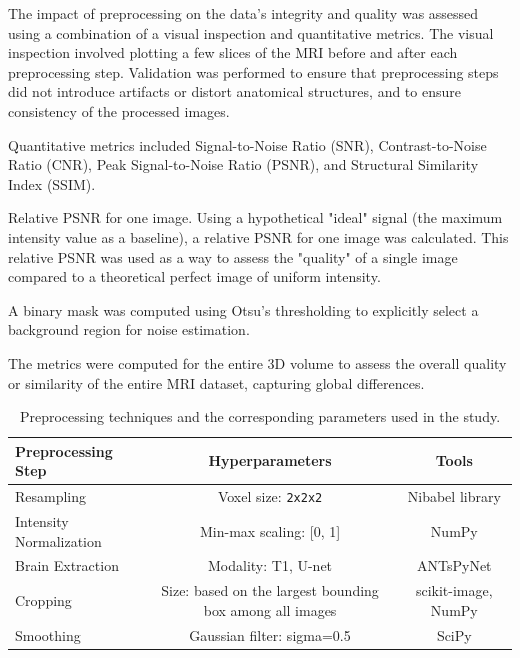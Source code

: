 The impact of preprocessing on the data's integrity and quality was assessed using a combination of a visual inspection and quantitative metrics. The visual inspection involved plotting a few slices of the MRI before and after each preprocessing step. Validation was performed to ensure that preprocessing steps did not introduce artifacts or distort anatomical structures, and to ensure consistency of the processed images.

Quantitative metrics included Signal-to-Noise Ratio (SNR), Contrast-to-Noise Ratio (CNR), Peak Signal-to-Noise Ratio (PSNR), and 
Structural Similarity Index (SSIM). 

Relative PSNR for one image. Using a hypothetical "ideal" signal (the maximum intensity value as a baseline), a relative PSNR for one image was calculated. This relative PSNR was used as a way to assess the "quality" of a single image compared to a theoretical perfect image of uniform intensity.

A binary mask was computed using Otsu's thresholding to explicitly select a background region for noise estimation.

The metrics were computed for the entire 3D volume to assess the overall quality or similarity of the entire MRI dataset, capturing global differences.
\begin{center}
    \begin{table}
        \centering
        \caption{\label{tab:preprocessing_pipeline}Preprocessing techniques and the corresponding parameters used in the study.}
        \begin{tabular*}{500pt}{@{\extracolsep\fill}lcc@{\extracolsep\fill}}
            \toprule
            \textbf{Preprocessing Step} & \textbf{Hyperparameters} & \textbf{Tools} \\
            \midrule
            Resampling & Voxel size: \texttt{2x2x2} & Nibabel library \\
            Intensity Normalization & Min-max scaling: [0, 1] & NumPy \\
            Brain Extraction & Modality: T1, U-net & ANTsPyNet \\
            Cropping & Size: based on the largest bounding box among all images & scikit-image, NumPy \\
            Smoothing & Gaussian filter: sigma=0.5 & SciPy \\
            \bottomrule
            \end{tabular*}
    \end{table}
\end{center}
%

